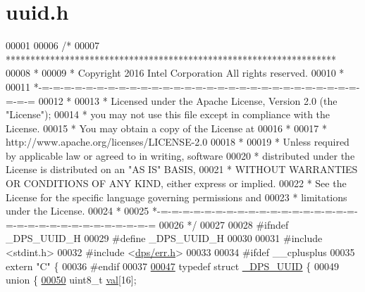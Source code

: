 \hypertarget{uuid_8h_source}{}\section{uuid.\+h}
\label{uuid_8h_source}

\begin{DoxyCode}
00001 
00006 \textcolor{comment}{/*}
00007 \textcolor{comment}{ *******************************************************************}
00008 \textcolor{comment}{ *}
00009 \textcolor{comment}{ * Copyright 2016 Intel Corporation All rights reserved.}
00010 \textcolor{comment}{ *}
00011 \textcolor{comment}{ *-=-=-=-=-=-=-=-=-=-=-=-=-=-=-=-=-=-=-=-=-=-=-=-=-=-=-=-=-=-=-=-=}
00012 \textcolor{comment}{ *}
00013 \textcolor{comment}{ * Licensed under the Apache License, Version 2.0 (the "License");}
00014 \textcolor{comment}{ * you may not use this file except in compliance with the License.}
00015 \textcolor{comment}{ * You may obtain a copy of the License at}
00016 \textcolor{comment}{ *}
00017 \textcolor{comment}{ *      http://www.apache.org/licenses/LICENSE-2.0}
00018 \textcolor{comment}{ *}
00019 \textcolor{comment}{ * Unless required by applicable law or agreed to in writing, software}
00020 \textcolor{comment}{ * distributed under the License is distributed on an "AS IS" BASIS,}
00021 \textcolor{comment}{ * WITHOUT WARRANTIES OR CONDITIONS OF ANY KIND, either express or implied.}
00022 \textcolor{comment}{ * See the License for the specific language governing permissions and}
00023 \textcolor{comment}{ * limitations under the License.}
00024 \textcolor{comment}{ *}
00025 \textcolor{comment}{ *-=-=-=-=-=-=-=-=-=-=-=-=-=-=-=-=-=-=-=-=-=-=-=-=-=-=-=-=-=-=-=-=}
00026 \textcolor{comment}{ */}
00027 
00028 \textcolor{preprocessor}{#ifndef \_DPS\_UUID\_H}
00029 \textcolor{preprocessor}{#define \_DPS\_UUID\_H}
00030 
00031 \textcolor{preprocessor}{#include <stdint.h>}
00032 \textcolor{preprocessor}{#include <\hyperlink{err_8h}{dps/err.h}>}
00033 
00034 \textcolor{preprocessor}{#ifdef \_\_cplusplus}
00035 \textcolor{keyword}{extern} \textcolor{stringliteral}{"C"} \{
00036 \textcolor{preprocessor}{#endif}
00037 
\hyperlink{struct___d_p_s___u_u_i_d}{00047} \textcolor{keyword}{typedef} \textcolor{keyword}{struct }\hyperlink{struct___d_p_s___u_u_i_d}{\_DPS\_UUID} \{
00049     \textcolor{keyword}{union }\{
\hyperlink{struct___d_p_s___u_u_i_d_a5f642859395d3916ea96804c6bf16880}{00050}         uint8\_t \hyperlink{struct___d_p_s___u_u_i_d_a5f642859395d3916ea96804c6bf16880}{val}[16]; 

\end{DoxyCode}
